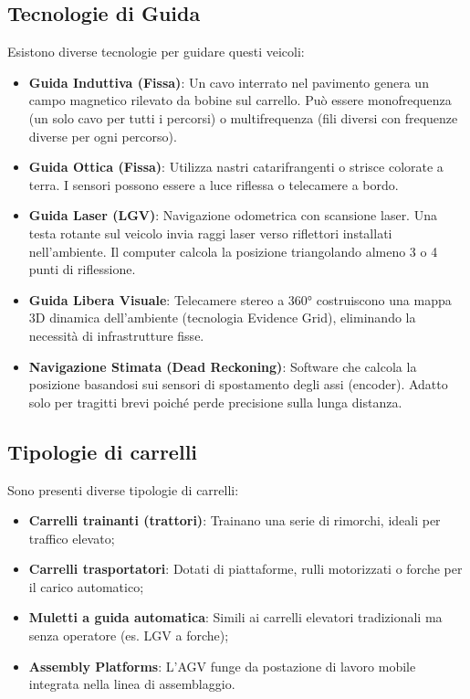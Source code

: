 \subsection{Tecnologie di Guida}
Esistono diverse tecnologie per guidare questi veicoli:
\begin{itemize}
    \item \textbf{Guida Induttiva (Fissa)}: Un cavo interrato nel pavimento genera un campo magnetico rilevato da bobine sul carrello. Può essere monofrequenza (un solo cavo per tutti i percorsi) o multifrequenza (fili diversi con frequenze diverse per ogni percorso).
    \item \textbf{Guida Ottica (Fissa)}: Utilizza nastri catarifrangenti o strisce colorate a terra. I sensori possono essere a luce riflessa o telecamere a bordo.
    \item \textbf{Guida Laser (LGV)}: Navigazione odometrica con scansione laser. Una testa rotante sul veicolo invia raggi laser verso riflettori installati nell'ambiente. Il computer calcola la posizione triangolando almeno 3 o 4 punti di riflessione.
    \item \textbf{Guida Libera Visuale}: Telecamere stereo a 360° costruiscono una mappa 3D dinamica dell'ambiente (tecnologia Evidence Grid), eliminando la necessità di infrastrutture fisse.
    \item \textbf{Navigazione Stimata (Dead Reckoning)}: Software che calcola la posizione basandosi sui sensori di spostamento degli assi (encoder). Adatto solo per tragitti brevi poiché perde precisione sulla lunga distanza.
\end{itemize}

%
\subsection{Tipologie di carrelli}
Sono presenti diverse tipologie di carrelli:
\begin{itemize}
    \item \textbf{Carrelli trainanti (trattori)}: Trainano una serie di rimorchi, ideali per traffico elevato;
    \item \textbf{Carrelli trasportatori}: Dotati di piattaforme, rulli motorizzati o forche per il carico automatico;
    \item \textbf{Muletti a guida automatica}: Simili ai carrelli elevatori tradizionali ma senza operatore (es. LGV a forche);
    \item \textbf{Assembly Platforms}: L'AGV funge da postazione di lavoro mobile integrata nella linea di assemblaggio.
\end{itemize}

